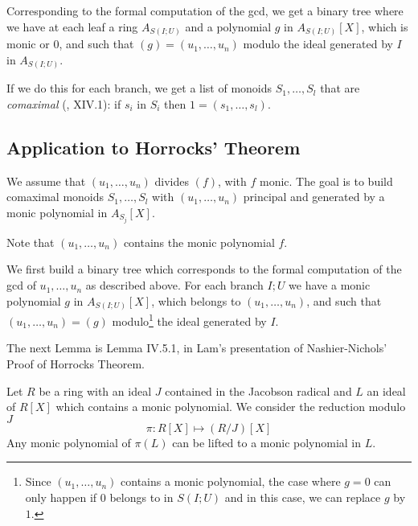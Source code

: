 Corresponding to the formal computation of the gcd, we get a binary tree where we have at each leaf
a ring $A_{S(I;U)}$ and a polynomial $g$ in $A_{S(I;U)}[X]$, which is monic or $0$, and
such that $(g) = (u_1,\dots,u_n)$ modulo the ideal generated by $I$ in $A_{S(I;U)}$.


If we do this for each branch, we get a list of monoids $S_1,\dots,S_l$
that are {\em comaximal} (\cite{lombardi-quitte}, XIV.1): if $s_i$ in $S_i$ then $1 = (s_1,\dots,s_l)$.

\subsection{Application to Horrocks' Theorem}

We assume that $(u_1,\dots,u_n)$ divides $(f)$, with $f$ monic.
The goal is to build comaximal monoids $S_1,\dots,S_l$ with $(u_1,\dots,u_n)$ principal
and generated by a monic polynomial in $A_{S_j}[X]$.

Note that $(u_1,\dots,u_n)$ contains the monic polynomial $f$.

We first build a binary tree which corresponds to the formal computation of the gcd of
$u_1,\dots,u_n$ as described above. For each branch $I;U$ we have a monic polynomial
$g$ in $A_{S(I;U)}[X]$, which belongs to $(u_1,\dots,u_n)$, and
such that $(u_1,\dots,u_n) = (g)$ modulo\footnote{Since $(u_1,\dots,u_n)$
contains a monic polynomial, the case where $g=0$ can only happen if $0$ belongs to in $S(I;U)$ and in this
case, we can replace $g$ by $1$.} the ideal generated by $I$.

The next Lemma is Lemma IV.5.1, \cite{Lam} in Lam's presentation of
Nashier-Nichols' Proof of Horrocks Theorem.

\begin{lemma}
  Let $R$ be a ring with an ideal $J$ contained in the Jacobson radical
  and $L$ an ideal of $R[X]$ which contains a monic polynomial. We consider
  the reduction modulo $J$
  $$\pi: R[X]\mapsto (R/J)[X]$$
  Any monic polynomial of $\pi(L)$ can be lifted to a monic polynomial in $L$.
\end{lemma}

